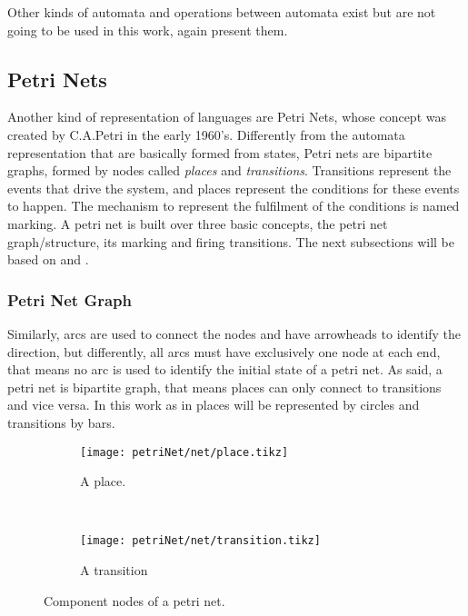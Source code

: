 Other kinds of automata and operations between automata exist but are not going
to be used in this work, again \cite{cassandras2009introduction} present them.

\subsection{Petri Nets}
\label{sec:petriNets}
Another kind of representation of languages are Petri Nets, whose concept was created by C.A.Petri
in the early 1960's. Differently from the automata representation that are
basically formed from states, Petri nets are bipartite graphs, formed by nodes
called \emph{places} and \emph{transitions}.
Transitions represent the events that drive the system, and places represent the
conditions for these events to happen. The mechanism to represent the fulfilment
of the conditions
is named marking. A petri net is built over three basic concepts, the petri net
graph\slash structure, its marking and firing transitions.
The next subsections will be based on \cite{david2005discrete} and \cite{cassandras2009introduction}.

\subsubsection{Petri Net Graph}
\label{sec:petrinetGraph}
Similarly, arcs are used to connect
the nodes and have arrowheads to identify the direction,
but differently, all arcs must have exclusively one node at each end, that means
no arc is used to identify the initial state of a petri net. As said, a petri net is
bipartite graph, that means places can only connect to transitions and vice
versa. In this work as in \cite{david2005discrete} places will be represented by
circles and transitions by bars. 
\begin{figure}[H]
  \centering
  \begin{subfigure}[t]{0.45\textwidth}
  \centering
  \texttt{[image: petriNet/net/place.tikz]}
  \caption{A place.}
\end{subfigure}
~
\begin{subfigure}[t]{0.5\textwidth}
  \centering
  \texttt{[image: petriNet/net/transition.tikz]}
  \caption{A transition}
\end{subfigure}
  \caption{Component nodes of a petri net.}  
\end{figure}

